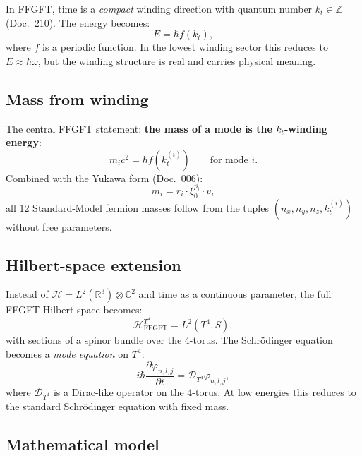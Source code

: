 In FFGFT, time is a \emph{compact} winding direction with quantum
number $k_t \in \mathbb{Z}$ (Doc.~210). The energy becomes:
\begin{equation}
  \boxed{
    E = \hbar f(k_t),
  }
\end{equation}
where $f$ is a periodic function. In the lowest winding sector this
reduces to $E \approx \hbar \omega$, but the winding structure is
real and carries physical meaning.

\subsection{Mass from winding}

The central FFGFT statement: \textbf{the mass of a mode is the
$k_t$-winding energy}:
\begin{equation}
  m_i c^2 = \hbar f(k_t^{(i)})
  \qquad \text{for mode $i$}.
\end{equation}
Combined with the Yukawa form (Doc.~006):
\begin{equation}
  m_i = r_i \cdot \xi_0^{p_i} \cdot v,
\end{equation}
all 12 Standard-Model fermion masses follow from the tuples
$(n_x, n_y, n_z, k_t^{(i)})$ without free parameters.

\subsection{Hilbert-space extension}

Instead of $\mathcal{H} = L^2(\mathbb{R}^3) \otimes \mathbb{C}^2$ and
time as a continuous parameter, the full FFGFT Hilbert space becomes:
\begin{equation}
  \mathcal{H}^{T^4}_{\text{FFGFT}} = L^2(T^4, S),
\end{equation}
with sections of a spinor bundle over the 4-torus. The Schrödinger
equation becomes a \emph{mode equation} on $T^4$:
\begin{equation}
  i\hbar \frac{\partial \varphi_{n,l,j}}{\partial t}
  = \mathcal{D}_{T^4} \varphi_{n,l,j},
\end{equation}
where $\mathcal{D}_{T^4}$ is a Dirac-like operator on the 4-torus.
At low energies this reduces to the standard Schrödinger equation
with fixed mass.

\subsection{Mathematical model}


